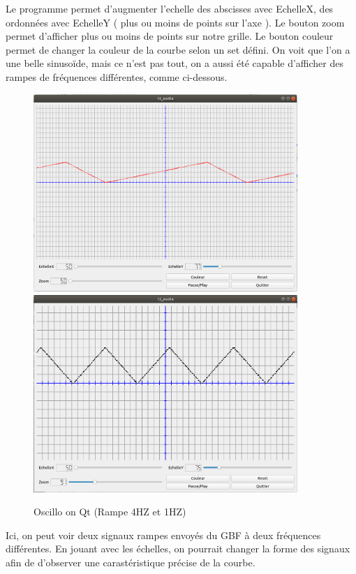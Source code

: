 \documentclass[11pt, french]{article}
\begin{document}
Le programme permet d'augmenter l'echelle des abscisses avec EchelleX, des ordonnées avec EchelleY ( plus ou moins de points sur l'axe ). Le bouton zoom permet d'afficher plus ou moins de points sur notre grille. Le bouton couleur permet de changer la couleur de la courbe selon un set défini.
On voit que l'on a une belle sinusoïde, mais ce n'est pas tout, on a aussi été capable d'afficher des rampes de fréquences différentes, comme ci-dessous.

\newpage

\begin{figure}[htb]
\centering
\includegraphics[width=10cm]{Rampe4ghz.png}
\includegraphics[width=10cm]{oscillotriangle.png}
\caption{Oscillo on Qt (Rampe 4HZ et 1HZ)}
\label{fig:rampe1}
\end{figure}
\vspace*{0.1cm}

Ici, on peut voir deux signaux rampes envoyés du GBF à deux fréquences différentes. En jouant avec les échelles, on pourrait changer la forme des signaux afin de d'observer une carastéristique précise de la courbe.
\end{document}
